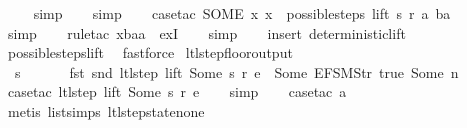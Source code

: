 \begin{isabellebody}
\ \ \ \isamarkupfalse%
\ simp\isanewline
\ \ \isamarkupfalse%
\ simp\isanewline
\ \ \isamarkupfalse%
\ {\isacharparenleft}case{\isacharunderscore}tac\ {\isachardoublequoteopen}SOME\ x{\isachardot}\ x\ {\isacharbar}{\isasymin}{\isacharbar}\ possible{\isacharunderscore}steps\ lift\ s\ r\ a\ ba{\isachardoublequoteclose}{\isacharparenright}\isanewline
\ \ \isamarkupfalse%
\ simp\isanewline
\ \ \isamarkupfalse%
\ {\isacharparenleft}rule{\isacharunderscore}tac\ x{\isacharequal}baa\ \ exI{\isacharparenright}\isanewline
\ \ \isamarkupfalse%
\ simp\isanewline
\ \ \isamarkupfalse%
\ {\isacharparenleft}insert\ deterministic{\isacharunderscore}lift{\isacharparenright}\isanewline
\ \ \isamarkupfalse%
\ possible{\isacharunderscore}steps{\isacharunderscore}lift\ \isamarkupfalse%
\ fastforce%
\endisatagproof
{\isafoldproof}%
%
\isadelimproof
\isanewline
%
\endisadelimproof
\isanewline
{}\isamarkupfalse%
\ ltl{\isacharunderscore}step{\isacharunderscore}floor{\isacharunderscore}output{\isacharcolon}\isanewline
\ \ {\isachardoublequoteopen}s\ {\isasymin}\ {\isacharbraceleft}{}{\isacharcomma}\ {}{\isacharcomma}\ {}{\isacharcomma}\ {}{\isacharbraceright}\ {\isasymLongrightarrow}\ fst\ {\isacharparenleft}snd\ {\isacharparenleft}ltl{\isacharunderscore}step\ lift\ {\isacharparenleft}Some\ s{\isacharparenright}\ r\ e{\isacharparenright}{\isacharparenright}\ {\isasymnoteq}\ {\isacharbrackleft}Some\ {\isacharparenleft}EFSM{\isachardot}Str\ {\isacharprime}{\isacharprime}true{\isacharprime}{\isacharprime}{\isacharparenright}{\isacharcomma}\ Some\ n{\isacharbrackright}{\isachardoublequoteclose}\isanewline
%
\isadelimproof
\ \ %
\endisadelimproof
%
\isatagproof
{}\isamarkupfalse%
\ {\isacharparenleft}case{\isacharunderscore}tac\ {\isachardoublequoteopen}ltl{\isacharunderscore}step\ lift\ {\isacharparenleft}Some\ s{\isacharparenright}\ r\ e{\isachardoublequoteclose}{\isacharparenright}\isanewline
\ \ \isamarkupfalse%
\ simp\isanewline
\ \ \isamarkupfalse%
\ {\isacharparenleft}case{\isacharunderscore}tac\ a{\isacharparenright}\isanewline
\ \ \ \isamarkupfalse%
\ {\isacharparenleft}metis\ list{\isachardot}simps{\isacharparenleft}{}{\isacharparenright}\ ltl{\isacharunderscore}step{\isacharunderscore}state{\isacharunderscore}none{\isacharparenright}\isanewline
\ \ \isamarkupfalse%

\end{isabellebody}
